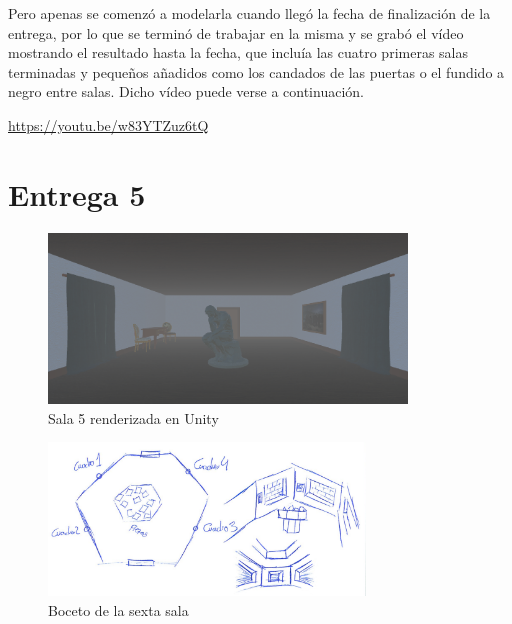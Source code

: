 Pero apenas se comenzó a modelarla cuando llegó la fecha de finalización de la entrega, por lo que se terminó de trabajar en la misma y se grabó el vídeo mostrando el resultado hasta la fecha, que incluía las cuatro primeras salas terminadas y pequeños añadidos como los candados de las puertas o el fundido a negro entre salas. Dicho vídeo puede verse a continuación.

\begin{center}
    \url{https://youtu.be/w83YTZuz6tQ}
\end{center}



\section{Entrega 5}

\begin{figure}[!h]
\begin{center}
\includegraphics[width=0.85\textwidth]{imagenes/7/salas-unity/unity-sala-5.png}
\caption{Sala 5 renderizada en Unity}
\label{fig:unity-sala-5}
\end{center}
\end{figure}


\begin{figure}[!h]
\begin{center}
\includegraphics[width=0.75\textwidth]{imagenes/7/bocetos/boceto-sala-6.png}
\caption{Boceto de la sexta sala}
\label{fig:boceto-sala-6}
\end{center}
\end{figure}

